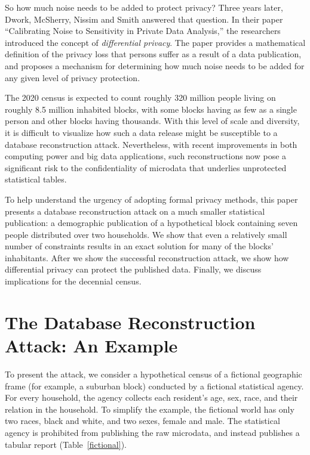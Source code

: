 \documentclass[runningheads]{llncs}
\begin{document}
So how much noise needs to be added to protect privacy? Three years
later, Dwork, McSherry, Nissim and Smith answered that question. In
their paper ``Calibrating Noise to Sensitivity in Private Data
Analysis,''\cite{Dwork:2006:CNS:2180286.2180305} the researchers
introduced the concept of \emph{differential privacy}. The paper
provides a mathematical definition of the privacy loss that
persons suffer as a result of a data publication, and proposes a
mechanism for determining how much noise needs to be added for any
given level of privacy protection.

The 2020 census is expected to count roughly 320 million people living
on roughly 8.5 million inhabited blocks, with some blocks having as
few as a single person and other blocks having thousands. With this
level of scale and diversity, it is difficult to visualize how such a
data release might be susceptible to a database reconstruction
attack. Nevertheless, with recent improvements in both computing power
and big data applications, such reconstructions now pose a significant
risk to the confidentiality of microdata that underlies unprotected
statistical tables.

To help understand the urgency of adopting formal privacy methods,
this paper presents a database reconstruction attack on a much smaller
statistical publication: a demographic publication of a hypothetical
block containing seven people distributed over two households. We show
that even a relatively small number of constraints results in an exact
solution for many of the blocks' inhabitants. After we show the
successful reconstruction attack, we show how differential privacy can
protect the published data. Finally, we discuss implications for the
decennial census.

\section{The Database Reconstruction Attack: An Example}

To present the attack, we consider a hypothetical
census of a fictional geographic frame (for example, a suburban block)
conducted by a fictional statistical
agency. For every household, the agency collects each resident's age,
sex, race, and their relation in the household. To simplify the example,
the fictional world has only two races, black and white, and two
sexes, female and male. The statistical agency
is prohibited from publishing the raw microdata, and instead publishes
a tabular report (Table~\ref{fictional}). 
\end{document}
